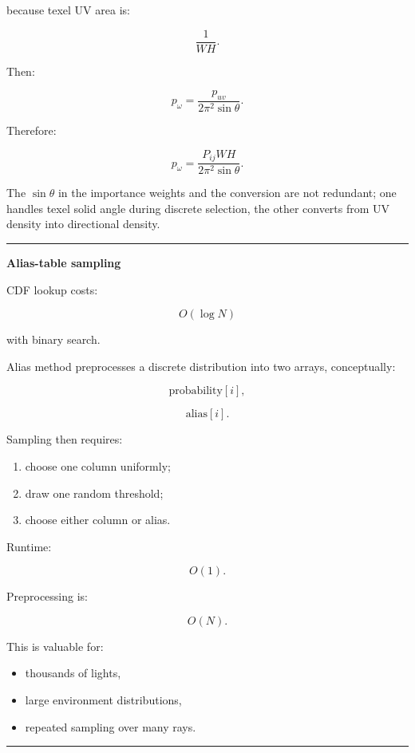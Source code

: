 because texel UV area is:

\[
\frac1{WH}.
\]

Then:

\[
p_\omega
=
\frac{
p_{uv}
}{
2\pi^2\sin\theta
}.
\]

Therefore:

\[
\boxed{
p_\omega
=
\frac{
P_{ij}WH
}{
2\pi^2\sin\theta
}.
}
\]

The \(\sin\theta\) in the importance weights and the conversion are not redundant; one handles texel solid angle during discrete selection, the other converts from UV density into directional density.

\begin{center}\rule{0.5\linewidth}{0.5pt}\end{center}

\textbf{Alias-table sampling}

CDF lookup costs:

\[
O(\log N)
\]

with binary search.

Alias method preprocesses a discrete distribution into two arrays, conceptually:

\[
\text{probability}[i],
\]

\[
\text{alias}[i].
\]

Sampling then requires:

\begin{enumerate}
\def\labelenumi{\arabic{enumi}.}
\tightlist
\item
  choose one column uniformly;
\item
  draw one random threshold;
\item
  choose either column or alias.
\end{enumerate}

Runtime:

\[
\boxed{O(1).}
\]

Preprocessing is:

\[
O(N).
\]

This is valuable for:

\begin{itemize}
\tightlist
\item
  thousands of lights,
\item
  large environment distributions,
\item
  repeated sampling over many rays.
\end{itemize}

\begin{center}\rule{0.5\linewidth}{0.5pt}\end{center}


